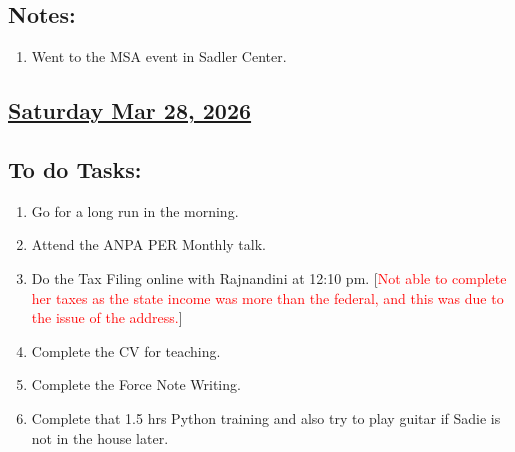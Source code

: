 \subsection*{Notes:}
\begin{enumerate}
    \item Went to the MSA event in Sadler Center.
\end{enumerate}
\subsection*{\underline{Saturday Mar 28, 2026} }
\subsection*{To do Tasks:}
\begin{enumerate}
    \item Go for a long run in the morning. \cmark
    \item Attend the ANPA PER Monthly talk. \xmark
    \item Do the Tax Filing online with Rajnandini at 12:10 pm. [\textcolor{red}{Not able to complete her taxes as the state income was more than the federal, and this was due to the issue of the address.}]  \cmark
    \item Complete the CV for teaching. \xmark
    \item Complete the Force Note Writing. \xmark
    \item Complete that 1.5 hrs Python training and also try to play guitar if Sadie is not in the house later. \xmark
\end{enumerate}
\stardivider
